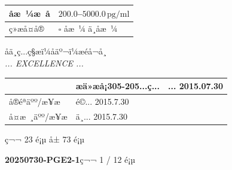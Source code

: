 \documentclass[UTF8,10pt,a4paper,fontset=fandol]{ctexart}
\newcommand{\fieldvalue}[1]{#1}
\newcommand{\handwritten}[1]{#1}
\begin{document}
\normalsize

\begin{tabularx}{\textwidth}{|p{}|X|}
\hline
åæ ¼æ å & $200.0$--$5000.0\,\mathrm{pg/ml}$\\
\hline
ç»æå¤å® &
$\square$ åæ ¼ \quad
\fieldvalue{\handwritten{\checkmark}} ä¸åæ ¼\\
\hline
\end{tabularx}


\newpage

\begin{center}
\small
åä¸­ç...ç§æï¼åäº¬ï¼æéå¬å¸\\[-1mm]
\scriptsize
\textit{... EXCELLENCE ...}\\[2mm]
\begin{tabularx}{0.88\textwidth}{|>{\centering\arraybackslash}p{2.2cm}|X|>{\centering\arraybackslash}p{3.0cm}|}
\hline
\multicolumn{1}{|c|}{å¤æ³¨} &
\fieldvalue{\handwritten{æä»æå¡305-205...ç...}} &
\fieldvalue{\handwritten{... 2015.07.30}}\\
\hline
å®éªäºº/æ¥æ &
\fieldvalue{\handwritten{é©... 2015.7.30}} &
\\
\hline
å¤æ ¸äºº/æ¥æ &
\fieldvalue{\handwritten{ä¸... 2015.7.30}} &
\\
\hline
\end{tabularx}
\end{center}

\vfill

\begin{center}
\scriptsize ç¬¬ 23 é¡µ å± 73 é¡µ
\end{center}

\newpage

\begin{center}
\textbf{20250730-PGE2-1}\hfill ç¬¬ 1 / 12 é¡µ
\end{center}
\end{document}
